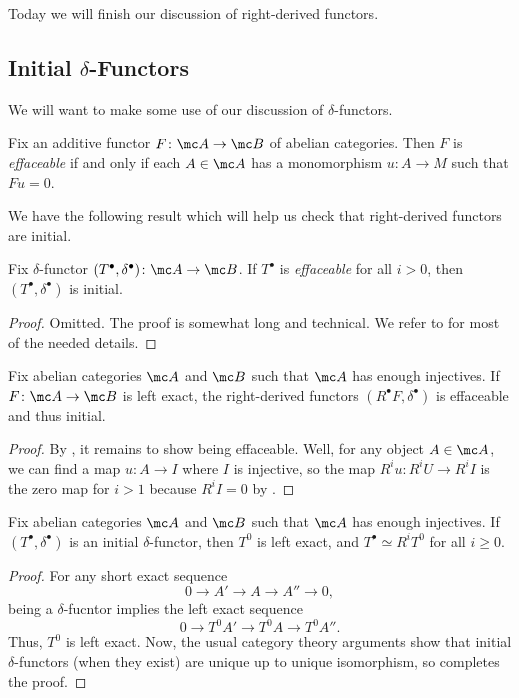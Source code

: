 \documentclass[../notes.tex]{subfiles}
\begin{document}
Today we will finish our discussion of right-derived functors.

\subsection{Initial \texorpdfstring{$\delta$}{ Delta}-Functors}
We will want to make some use of our discussion of $\delta$-functors.
\begin{definition}[effaceable]
	Fix an additive functor $F\colon\mc A\to\mc B$ of abelian categories. Then $F$ is \textit{effaceable} if and only if each $A\in\mc A$ has a monomorphism $u\colon A\to M$ such that $Fu=0$.
\end{definition}
We have the following result which will help us check that right-derived functors are initial.
\begin{theorem} \label{thm:eff-to-init}
	Fix $\delta$-functor $(T^\bullet,\delta^\bullet)\colon\mc A\to\mc B$. If $T^\bullet$ is \textit{effaceable} for all $i>0$, then $(T^\bullet,\delta^\bullet)$ is initial.
\end{theorem}
\begin{proof}
	Omitted. The proof is somewhat long and technical. We refer to \cite[Theorem~2.4.7]{weibel} for most of the needed details.
\end{proof}
\begin{corollary} \label{cor:right-derived-is-initial}
	Fix abelian categories $\mc A$ and $\mc B$ such that $\mc A$ has enough injectives. If $F\colon\mc A\to\mc B$ is left exact, the right-derived functors $(R^\bullet F,\delta^\bullet)$ is effaceable and thus initial.
\end{corollary}
\begin{proof}
	By , it remains to show being effaceable. Well, for any object $A\in\mc A$, we can find a map $u\colon A\to I$ where $I$ is injective, so the map $R^iu\colon R^iU\to R^iI$ is the zero map for $i>1$ because $R^iI=0$ by .
\end{proof}
\begin{corollary}
	Fix abelian categories $\mc A$ and $\mc B$ such that $\mc A$ has enough injectives. If $(T^\bullet,\delta^\bullet)$ is an initial $\delta$-functor, then $T^0$ is left exact, and $T^\bullet\simeq R^iT^0$ for all $i\ge0$.
\end{corollary}
\begin{proof}
	For any short exact sequence
	\[0\to A'\to A\to A''\to0,\]
	being a $\delta$-fucntor implies the left exact sequence
	\[0\to T^0A'\to T^0A\to T^0A''.\]
	Thus, $T^0$ is left exact. Now, the usual category theory arguments show that initial $\delta$-functors (when they exist) are unique up to unique isomorphism, so  completes the proof.
\end{proof}
\end{document}
